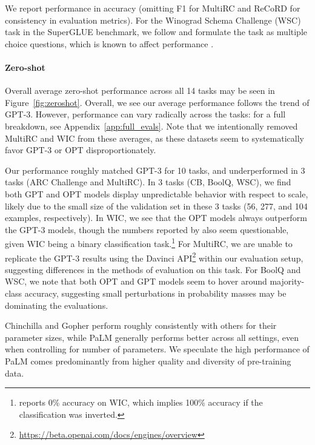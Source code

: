 We report performance in accuracy (omitting F1 for MultiRC and ReCoRD for consistency in evaluation metrics). For the Winograd Schema Challenge (WSC) task in the SuperGLUE benchmark, we follow \cite{brown2020gpt3} and formulate the task as multiple choice questions, which is known to affect performance \cite{liu2020precise}.

\paragraph{Zero-shot} Overall average zero-shot performance across all 14 tasks may be seen in Figure~\ref{fig:zeroshot}. Overall, we see our average performance follows the trend of GPT-3. However, performance can vary radically across the tasks: for a full breakdown, see Appendix~\ref{app:full_evals}.  Note that we intentionally removed MultiRC and WIC from these averages, as these datasets seem to systematically favor GPT-3 or OPT disproportionately.

Our performance roughly matched GPT-3 for 10 tasks, and underperformed in 3 tasks (ARC Challenge and MultiRC). In 3 tasks (CB, BoolQ, WSC), we find both GPT and OPT models display unpredictable behavior with respect to scale, likely due to the small size of the validation set in these 3 tasks (56, 277, and 104 examples, respectively). In WIC, we see that the OPT models always outperform the GPT-3 models, though the numbers reported by \citet{brown2020gpt3} also seem questionable, given WIC being a binary classification task.\footnote{\citet{brown2020gpt3} reports 0\% accuracy on WIC, which implies 100\% accuracy if the classification was inverted.} For MultiRC, we are unable to replicate the GPT-3 results using the {Davinci} API\footnote{\url{https://beta.openai.com/docs/engines/overview}} within our evaluation setup, suggesting differences in the methods of evaluation on this task. For BoolQ and WSC, we note that both OPT and GPT models seem to hover around majority-class accuracy, suggesting small perturbations in probability masses may be dominating the evaluations.

Chinchilla \cite{chinchilla2022} and Gopher \cite{gopher2022} perform roughly consistently with others for their parameter sizes, while PaLM \cite{palm2022} generally performs better across all settings, even when controlling for number of parameters. We speculate the high performance of PaLM comes predominantly from higher quality and diversity of pre-training data.

